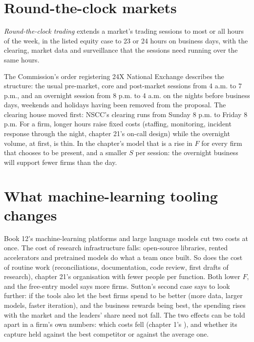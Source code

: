 \section{Round-the-clock markets}

\begin{definition}\label{def:fm:competition-and-the-future:rtc}
\emph{Round-the-clock trading} extends a market's trading sessions to most or all hours of the week, in the listed
equity case to 23 or 24 hours on business days, with the clearing, market data and surveillance that the sessions need running over the same hours.
\end{definition}

The Commission's order registering 24X National Exchange describes the structure: the usual pre-market, core and post-market sessions from 4 a.m. to
7 p.m., and an overnight session from 8 p.m. to 4 a.m. on the nights before business days, weekends and holidays having been removed from the
proposal. The clearing house moved first: NSCC's clearing runs from Sunday 8 p.m. to Friday 8 p.m. For a firm, longer hours raise fixed costs
(staffing, monitoring, incident response through the night, chapter 21's on-call design) while the overnight volume, at first, is thin. In the
chapter's model that is a rise in $F$ for every firm that chooses to be present, and a smaller $S$ per session: the overnight business will support
fewer firms than the day.

\section{What machine-learning tooling changes}

Book 12's machine-learning platforms and large language models cut two costs at once. The cost of research infrastructure falls: open-source libraries,
rented accelerators and pretrained models do what a team once built. So does the cost of routine work (reconciliations, documentation, code review,
first drafts of research), chapter 21's organisation with fewer people per function. Both lower $F$, and the free-entry model says more firms. Sutton's
second case says to look further: if the tools also let the best firms spend to be better (more data, larger models, faster iteration), and the
business rewards being best, the spending rises with the market and the leaders' share need not fall. The two effects can be told apart in a firm's
own numbers: which costs fell (chapter 1's ), and whether its capture held against the best competitor or against the average one.

